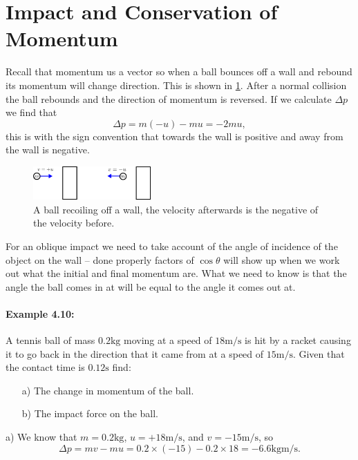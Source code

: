 \documentclass[a4paper,12pt]{book}
\begin{document}
\section{Impact and Conservation of Momentum}
Recall that momentum us a vector so when a ball bounces off a wall and rebound its momentum will change direction.  This is shown in \cref{fig: recoiling ball}. After a normal collision the ball rebounds and the direction of momentum is reversed. If we calculate $\Delta p$ we find that
\begin{equation*}
\Delta p=m(-u)-mu=-2mu,
\end{equation*}
this is with the sign convention that towards the wall is positive and away from the wall is negative.

\begin{figure}[ht]
    \centering
    \includegraphics[width=0.4\textwidth]{figures/recoil.png}
    \caption{A ball recoiling off a wall, the velocity afterwards is the negative of the velocity before.}
    \label{fig: recoiling ball}
\end{figure}

For an oblique impact we need to take account of the angle of incidence of the object on the wall -- done properly factors of $\cos\theta$ will show up when we work out what the initial and final momentum are. What we need to know is that the angle the ball comes in at will be equal to the angle it comes out at.

\paragraph{Example 4.10:} A tennis ball of mass $0.2\text{kg}$ moving at a speed of $18\text{m/s}$ is hit by a racket causing it to go back in the direction that it came from at a speed of $15\text{m/s}$. Given that the contact time is $0.12\text{s}$ find:
\begin{itemize}
\setlength{\itemsep}{-5pt}
    \item[a)] The change in momentum of the ball.
    \item[b)] The impact force on the ball.
\end{itemize} 
a) We know that $m=0.2\text{kg}$, $u=+18\text{m/s}$, and $v=-15\text{m/s}$, so 
\begin{equation*}
\Delta p=mv-mu=0.2\times(-15)-0.2\times 18=-6.6\text{kgm/s}.
\end{equation*}
\end{document}
